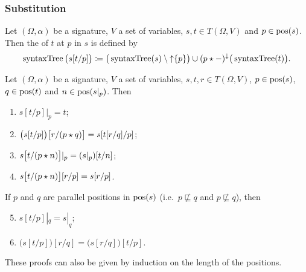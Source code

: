 \subsubsection{Substitution}
\begin{definition}
Let $(\Omega, \alpha)$ be a signature, $V$ a set of variables, $s,t\in T(\Omega, V)$ and $p\in \operatorname{pos}(s)$. Then the  of $t$ at $p$ in $s$ is defined by
\[ \operatorname{syntaxTree}\big(s[t/p]\big) \coloneqq \big(\operatorname{syntaxTree}(s) \setminus \operatorname{\uparrow}\{p\}\big) \cup (p\star -)^{\downarrow}\big(\operatorname{syntaxTree}(t)\big). \]
\end{definition}

\begin{proposition}
Let $(\Omega, \alpha)$ be a signature, $V$ a set of variables, $s,t,r\in T(\Omega, V)$, $p\in \operatorname{pos}(s)$, $q\in\operatorname{pos}(t)$ and $n\in\operatorname{pos}(s|_p)$. Then
\begin{enumerate}
\item $s[t/p]|_p = t$;
\item $\big(s[t/p]\big)\big[r/(p\star q)\big] = s[t[r/q]/p]$;
\item $s\big[t/(p\star n)\big]|_p = (s|_p)[t/n]$;
\item $s\big[t/(p\star n)\big][r/p] = s[r/p]$.
\end{enumerate}
If $p$ and $q$ are parallel positions in $\operatorname{pos}(s)$ (i.e.\ $p\not\sqsubseteq q$ and $p\not\sqsubseteq q$), then
\begin{enumerate} \setcounter{enumi}{4}
\item $s[t/p]|_q = s|_q$;
\item $\big(s[t/p]\big)[r/q] = \big(s[r/q]\big)[t/p]$.
\end{enumerate}
\end{proposition}
These proofs can also be given by induction on the length of the positions.

